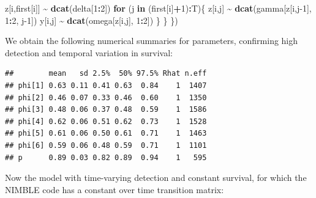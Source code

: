 \documentclass[
  12pt,
]{krantz}
\newenvironment{Shaded}{\begin{snugshade}}{\end{snugshade}}
\newcommand{\ControlFlowTok}[1]{\textcolor[rgb]{0.13,0.29,0.53}{\textbf{#1}}}
\newcommand{\DecValTok}[1]{\textcolor[rgb]{0.00,0.00,0.81}{#1}}
\newcommand{\FunctionTok}[1]{\textcolor[rgb]{0.13,0.29,0.53}{\textbf{#1}}}
\newcommand{\NormalTok}[1]{#1}
\newcommand{\SpecialCharTok}[1]{\textcolor[rgb]{0.81,0.36,0.00}{\textbf{#1}}}
\begin{document}
\begin{Shaded}
\begin{Highlighting}[]
\NormalTok{    z[i,first[i]] }\SpecialCharTok{\textasciitilde{}} \FunctionTok{dcat}\NormalTok{(delta[}\DecValTok{1}\SpecialCharTok{:}\DecValTok{2}\NormalTok{])}
    \ControlFlowTok{for}\NormalTok{ (j }\ControlFlowTok{in}\NormalTok{ (first[i]}\SpecialCharTok{+}\DecValTok{1}\NormalTok{)}\SpecialCharTok{:}\NormalTok{T)\{}
\NormalTok{      z[i,j] }\SpecialCharTok{\textasciitilde{}} \FunctionTok{dcat}\NormalTok{(gamma[z[i,j}\DecValTok{{-}1}\NormalTok{], }\DecValTok{1}\SpecialCharTok{:}\DecValTok{2}\NormalTok{, j}\DecValTok{{-}1}\NormalTok{])}
\NormalTok{      y[i,j] }\SpecialCharTok{\textasciitilde{}} \FunctionTok{dcat}\NormalTok{(omega[z[i,j], }\DecValTok{1}\SpecialCharTok{:}\DecValTok{2}\NormalTok{])}
\NormalTok{    \}}
\NormalTok{  \}}
\NormalTok{\})}
\end{Highlighting}
\end{Shaded}

We obtain the following numerical summaries for parameters, confirming high detection and temporal variation in survival:

\begin{verbatim}
##        mean   sd 2.5%  50% 97.5% Rhat n.eff
## phi[1] 0.63 0.11 0.41 0.63  0.84    1  1407
## phi[2] 0.46 0.07 0.33 0.46  0.60    1  1350
## phi[3] 0.48 0.06 0.37 0.48  0.59    1  1586
## phi[4] 0.62 0.06 0.51 0.62  0.73    1  1528
## phi[5] 0.61 0.06 0.50 0.61  0.71    1  1463
## phi[6] 0.59 0.06 0.48 0.59  0.71    1  1101
## p      0.89 0.03 0.82 0.89  0.94    1   595
\end{verbatim}

Now the model with time-varying detection and constant survival, for which the NIMBLE code has a constant over time transition matrix:
\end{document}
